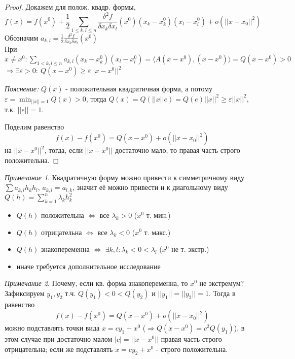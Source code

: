 \documentclass[a4paper]{article}
\theoremstyle{indented}
\theoremstyle{definition}
\theoremstyle{remark}
\newtheorem{remark}{Примечание}
\begin{document}
\begin{proof}
    Докажем для полож. квадр. формы, 
    \[
        f(x) = f(x^0) + \frac{1}{2} \sum\limits_{1 \leq k,l \leq n} \frac{\delta^2 f}{\delta x_k \delta x_l} (x^0) (x_k-x_k^0) (x_l-x_l^0) + o(||x-x_0||^2)
    \]
    Обозначим $a_{k,l} = \frac{1}{2} \frac{\delta^2 f}{\delta x_k \delta x_l} (x^0)$\\
    При $x\not=x^0: \sum\limits_{1 < k,l\leq n} a_{k,l} (x_k-x_k^0) (x_l-x_l^0) = \langle A(x-x^0), (x-x^0) \rangle = Q(x-x^0) > 0$
    $\Rightarrow \exists \varepsilon>0: \ Q(x-x^0) \geq \varepsilon ||x-x^0||^2$

    \textit{Пояснение: } $Q(x)$ - положительная квадратичная форма, а потому 
    $\displaystyle \varepsilon = \min_{||x||=1} Q(x) > 0$,
    тогда $Q(x)=Q(||x||e)=Q(e)||x||^2 \geq \varepsilon ||x||^2$, т.к. $||e||=1$.

    Поделим равенство
    \[
        f(x) - f(x^0) = Q(x-x^0) + o(||x-x_0||^2)
    \]
    на $||x-x^0||^2$, тогда, если $||x-x^0||$ достаточно мало, то правая часть строго положительна.
\end{proof}

\begin{remark}
    Квадратичную форму можно привести к симметричному виду $\sum a_{k,l} h_k h_l$,  $a_{k,l}=a_{l,k}$,
    значит её можно привести и к диагольному виду $Q(h) = \sum_{k=1}^n \lambda_k h_k^2$
    \begin{itemize}
        \item $Q(h)$ положительна $\Leftrightarrow$ все $\lambda_k > 0$ ($x^0$ т. мин.)
        \item $Q(h)$ отрицательна $\Leftrightarrow$ все $\lambda_k < 0$ ($x^0$ т. макс.)
        \item $Q(h)$ знакопеременна $\Leftrightarrow$ $\exists k,l: \lambda_k < 0 < \lambda_l$ ($x^0$ не т. экстр.)
        \item иначе требуется дополнительное исследование
    \end{itemize}
\end{remark}

\begin{remark}
    Почему, если кв. форма знакопеременна, то $x^0$ не экстремум? Зафиксируем $y_1, y_2$ т.ч. $Q(y_1) < 0 < Q(y_2)$ и $||y_1||=||y_2||=1$.
    Тогда в равенство
    \[
        f(x) - f(x^0) = Q(x-x^0) + o(||x-x_0||^2)
    \]
    можно подставлять точки вида $x=cy_1+x^0$ ($\Rightarrow Q(x-x^0)=c^2 Q(y_1)$), в этом случае при достаточно малом $|c|=||x-x^0||$
    правая часть строго отрицательна; если же подставлять $x=cy_2+x^0$ - строго положительна.
\end{remark}
\end{document}
